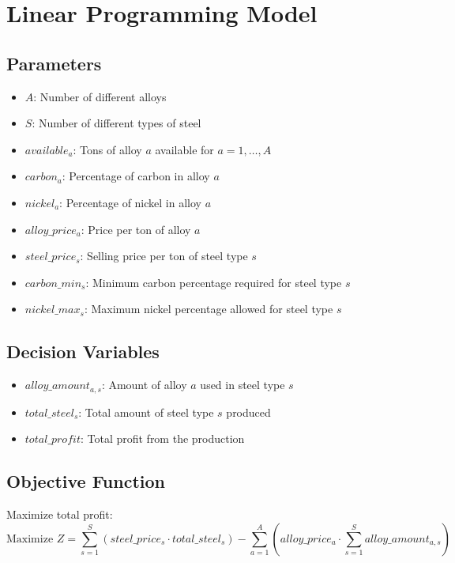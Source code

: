 \documentclass{article}
\begin{document}
\section*{Linear Programming Model}

\subsection*{Parameters}
\begin{itemize}
    \item $A$: Number of different alloys
    \item $S$: Number of different types of steel
    \item $available_a$: Tons of alloy $a$ available for $a = 1, \ldots, A$
    \item $carbon_{a}$: Percentage of carbon in alloy $a$
    \item $nickel_{a}$: Percentage of nickel in alloy $a$
    \item $alloy\_price_{a}$: Price per ton of alloy $a$
    \item $steel\_price_{s}$: Selling price per ton of steel type $s$
    \item $carbon\_min_{s}$: Minimum carbon percentage required for steel type $s$
    \item $nickel\_max_{s}$: Maximum nickel percentage allowed for steel type $s$
\end{itemize}

\subsection*{Decision Variables}
\begin{itemize}
    \item $alloy\_amount_{a,s}$: Amount of alloy $a$ used in steel type $s$
    \item $total\_steel_{s}$: Total amount of steel type $s$ produced
    \item $total\_profit$: Total profit from the production
\end{itemize}

\subsection*{Objective Function}
Maximize total profit:
\[
\text{Maximize } Z = \sum_{s=1}^{S} (steel\_price_{s} \cdot total\_steel_{s}) - \sum_{a=1}^{A} (alloy\_price_{a} \cdot \sum_{s=1}^{S} alloy\_amount_{a,s})
\]
\end{document}
